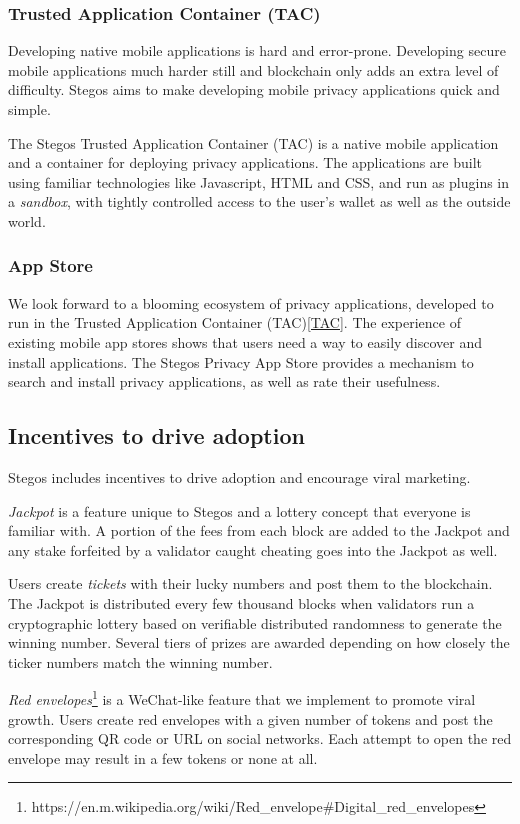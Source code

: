 \documentclass[a4paper, 10pt, conference]{ieeeconf}
\begin{document}
\subsubsection{Trusted Application Container (TAC)}
Developing native mobile applications is hard and error-prone. Developing secure mobile applications much harder still and blockchain only adds an extra level of difficulty. Stegos aims to make developing mobile privacy applications quick and simple. 

The Stegos Trusted Application Container (TAC) is a native mobile application and a container for deploying privacy applications. The applications are built using familiar technologies like Javascript, HTML and CSS, and run as plugins in a \textit{sandbox}, with tightly controlled access to the user's wallet as well as the outside world.

\subsubsection{App Store}
We look forward to a blooming ecosystem of privacy applications, developed to run in the Trusted Application Container (TAC)\ref{TAC}. The experience of existing mobile app stores shows that users need a way to easily discover and install applications. The Stegos Privacy App Store provides a mechanism to search and install privacy applications, as well as rate their usefulness. 

\subsection{Incentives to drive adoption}
Stegos includes incentives to drive adoption and encourage viral marketing. 

\textit{Jackpot} is a feature unique to Stegos and a lottery concept that everyone is familiar with. A portion of the fees from each block are added to the Jackpot and any stake forfeited by a validator caught cheating goes into the Jackpot as well. 

Users create \textit{tickets} with their lucky numbers and post them to the blockchain. The Jackpot is distributed every few thousand blocks when validators run a cryptographic lottery based on verifiable distributed randomness to generate the winning number. Several tiers of prizes are awarded depending on how closely the ticker numbers match the winning number. 

\textit{Red envelopes}\footnote{https://en.m.wikipedia.org/wiki/Red\_envelope\#Digital\_red\_envelopes} is a WeChat-like feature that we implement to promote viral growth. Users create red envelopes with a given number of tokens and post the corresponding QR code or URL on social networks. Each attempt to open the red envelope may result in a few tokens or none at all. 
\end{document}
